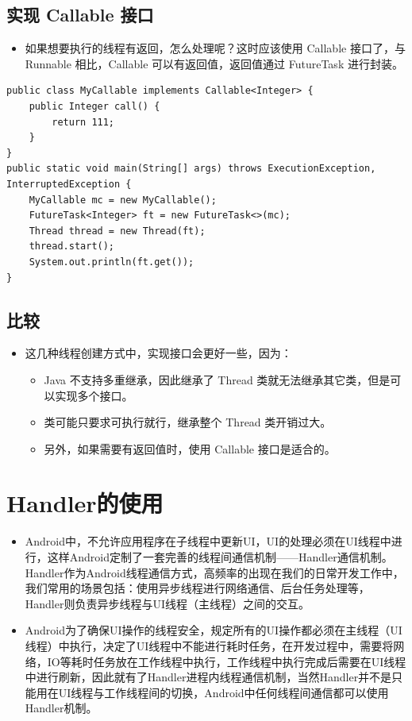 \documentclass[9pt, b5paper]{article}
\begin{document}
\subsection{实现 Callable 接口}
\label{sec-1-3}
\begin{itemize}
\item 如果想要执行的线程有返回，怎么处理呢？这时应该使用 Callable 接口了，与 Runnable 相比，Callable 可以有返回值，返回值通过 FutureTask 进行封装。
\end{itemize}
\begin{verbatim}
public class MyCallable implements Callable<Integer> {
    public Integer call() {
        return 111;
    }
}
public static void main(String[] args) throws ExecutionException, InterruptedException {
    MyCallable mc = new MyCallable();
    FutureTask<Integer> ft = new FutureTask<>(mc);
    Thread thread = new Thread(ft);
    thread.start();
    System.out.println(ft.get());
}
\end{verbatim}
\subsection{比较}
\label{sec-1-4}
\begin{itemize}
\item 这几种线程创建方式中，实现接口会更好一些，因为：
\begin{itemize}
\item Java 不支持多重继承，因此继承了 Thread 类就无法继承其它类，但是可以实现多个接口。
\item 类可能只要求可执行就行，继承整个 Thread 类开销过大。
\item 另外，如果需要有返回值时，使用 Callable 接口是适合的。
\end{itemize}
\end{itemize}

\section{Handler的使用}
\label{sec-2}
\begin{itemize}
\item Android中，不允许应用程序在子线程中更新UI，UI的处理必须在UI线程中进行，这样Android定制了一套完善的线程间通信机制——Handler通信机制。Handler作为Android线程通信方式，高频率的出现在我们的日常开发工作中，我们常用的场景包括：使用异步线程进行网络通信、后台任务处理等，Handler则负责异步线程与UI线程（主线程）之间的交互。
\item Android为了确保UI操作的线程安全，规定所有的UI操作都必须在主线程（UI线程）中执行，决定了UI线程中不能进行耗时任务，在开发过程中，需要将网络，IO等耗时任务放在工作线程中执行，工作线程中执行完成后需要在UI线程中进行刷新，因此就有了Handler进程内线程通信机制，当然Handler并不是只能用在UI线程与工作线程间的切换，Android中任何线程间通信都可以使用Handler机制。
\end{itemize}
\end{document}
